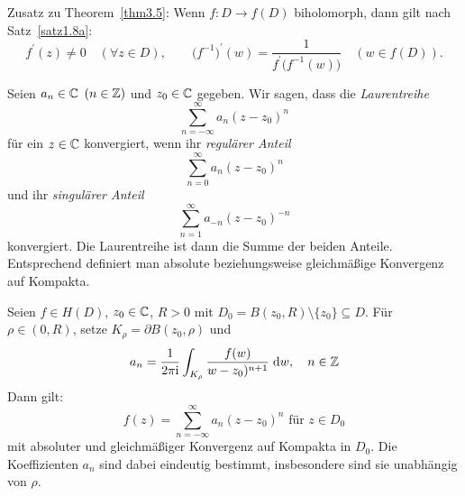 \documentclass[a4paper,twoside,DIV15,BCOR12mm]{scrbook}
\begin{document}


Zusatz zu Theorem~\ref{thm3.5}: Wenn $f\colon D\to f(D)$ biholomorph, dann gilt nach Satz~\ref{satz1.8a}:
\[f^\prime(z)\neq 0\quad(\forall z\in D),\qquad\bigl(f^{-1}\bigr)^\prime(w)=\frac{1}{f^\prime\bigl(f^{-1}(w)\bigr)}\quad(w\in f(D)).\]

Seien $a_n\in\mathbb{C}$ $(n\in\mathbb{Z})$ und $z_0\in\mathbb{C}$ gegeben. Wir sagen, dass die \textit{Laurentreihe}
\[\sum_{n=-\infty}^{\infty}a_n(z-z_0)^n\]
für ein $z\in\mathbb{C}$ konvergiert, wenn ihr \textit{regulärer Anteil}
\[\sum_{n=0}^{\infty}a_n(z-z_0)^n\]
und ihr \textit{singulärer Anteil}
\[\sum_{n=1}^{\infty}a_{-n}(z-z_0)^{-n}\]
konvergiert. Die Laurentreihe ist dann die Summe der beiden Anteile. Entsprechend definiert man absolute beziehungsweise gleichmäßige Konvergenz auf Kompakta.

\begin{thm}[Laurent]\label{thm3.6}
Seien $f\in H(D)$, $z_0\in\mathbb{C}$, $R>0$ mit $D_0=B(z_0,R)\setminus\{z_0\}\subseteq D$. Für $\rho\in(0,R)$, setze
$K_\rho=\partial B(z_0,\rho)$ und
\begin{equation}\label{3.1}
a_n=\frac{1}{2\pi\mathrm{i}}\int_{K_\rho}^{}{\frac{f(w)}{w-z_0)^{n+1}}}\;\mathrm{d} w,\quad n\in\mathbb{Z}
\end{equation}
Dann gilt:
\begin{equation}\label{3.2}
f(z)=\sum_{n=-\infty}^{\infty}a_n(z-z_0)^n\text{ für }z\in D_0
\end{equation}
mit absoluter und gleichmäßiger Konvergenz auf Kompakta in $D_0$. Die Koeffizienten $a_n$ sind dabei eindeutig bestimmt, insbesondere sind sie unabhängig von $\rho$.
\end{thm}
\end{document}
